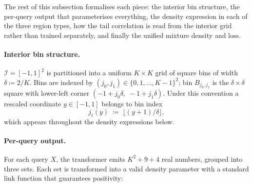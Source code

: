 \documentclass[11pt]{article}
\theoremstyle{plain}
\theoremstyle{definition}
\theoremstyle{remark}
\begin{document}
The rest of this subsection formalises each piece: the interior bin
structure, the per-query output that parameterises everything, the
density expression in each of the three region types, how the tail
correlation is read from the interior grid rather than trained
separately, and finally the unified mixture density and loss.

\paragraph{Interior bin structure.}
$\mathcal{I} = [-1, 1]^2$ is partitioned into a uniform $K \times K$
grid of square bins of width $\delta \coloneqq 2/K$. Bins are indexed
by $(j_0, j_1) \in \{0, 1, \ldots, K-1\}^2$; bin $B_{j_0, j_1}$ is the
$\delta \times \delta$ square with lower-left corner
$(-1 + j_0 \delta,\; -1 + j_1 \delta)$. Under this convention a
rescaled coordinate $y \in [-1, 1]$ belongs to bin index
\begin{equation}
  j_\ell(y) \;\coloneqq\; \lfloor (y + 1)/\delta \rfloor,
  \label{eq:bin-index}
\end{equation}
which appears throughout the density expressions below.

\paragraph{Per-query output.}
For each query $X$, the transformer emits $K^2 + 9 + 4$ real numbers,
grouped into three sets. Each set is transformed into a valid density
parameter with a standard link function that guarantees positivity:
\end{document}
